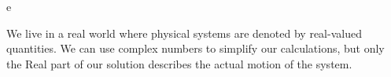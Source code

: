\documentclass[11pt]{article}
\theoremstyle{gangnamstyle}{\newtheorem{definition}{Definition}[]}
\theoremstyle{gangnamstyle}{\newtheorem{example}{Example}[]}
\theoremstyle{gangnamstyle}{\newtheorem{problem}{Problem}[]}
\theoremstyle{gangnamstyle}{\newtheorem{warning}{Warning}[]}
\begin{document}
e

\begin{warning}
We live in a real world where physical systems are denoted by real-valued quantities. We can use complex numbers to simplify our calculations, but only the Real part of our solution describes the actual motion of the system. 
\end{warning}
\end{document}
